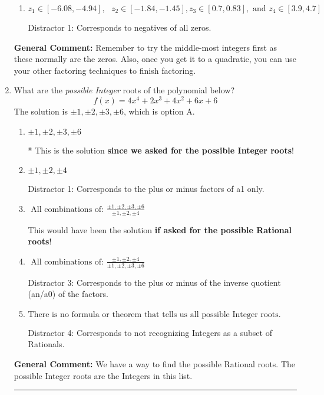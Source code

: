 \documentclass{extbook}[14pt]
\newcommand{\litem}[1]{\item #1

\rule{\textwidth}{0.4pt}}
\begin{document}
\begin{enumerate}
{\begin{enumerate}[label=\Alph*.]
 Distractor 2: Corresponds to inversing rational roots.
\item \( z_1 \in [-6.08, -4.94], \text{   }  z_2 \in [-1.84, -1.45], z_3 \in [0.7, 0.83], \text{   and   } z_4 \in [3.9, 4.7] \)

 Distractor 1: Corresponds to negatives of all zeros.
\end{enumerate}

\textbf{General Comment:} Remember to try the middle-most integers first as these normally are the zeros. Also, once you get it to a quadratic, you can use your other factoring techniques to finish factoring.
}
\litem{
What are the \textit{possible Integer} roots of the polynomial below?
\[ f(x) = 4x^{4} +2 x^{3} +4 x^{2} +6 x + 6 \]The solution is \( \pm 1,\pm 2,\pm 3,\pm 6 \), which is option A.\begin{enumerate}[label=\Alph*.]
\item \( \pm 1,\pm 2,\pm 3,\pm 6 \)

* This is the solution \textbf{since we asked for the possible Integer roots}!
\item \( \pm 1,\pm 2,\pm 4 \)

 Distractor 1: Corresponds to the plus or minus factors of a1 only.
\item \( \text{ All combinations of: }\frac{\pm 1,\pm 2,\pm 3,\pm 6}{\pm 1,\pm 2,\pm 4} \)

This would have been the solution \textbf{if asked for the possible Rational roots}!
\item \( \text{ All combinations of: }\frac{\pm 1,\pm 2,\pm 4}{\pm 1,\pm 2,\pm 3,\pm 6} \)

 Distractor 3: Corresponds to the plus or minus of the inverse quotient (an/a0) of the factors. 
\item \( \text{There is no formula or theorem that tells us all possible Integer roots.} \)

 Distractor 4: Corresponds to not recognizing Integers as a subset of Rationals.
\end{enumerate}

\textbf{General Comment:} We have a way to find the possible Rational roots. The possible Integer roots are the Integers in this list.
}
\end{enumerate}
\end{document}
